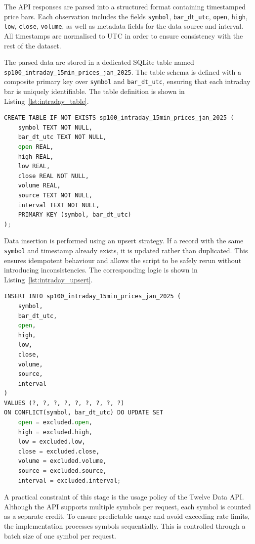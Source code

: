 The API responses are parsed into a structured format containing timestamped price bars. Each observation includes the fields \texttt{symbol}, \texttt{bar\_dt\_utc}, \texttt{open}, \texttt{high}, \texttt{low}, \texttt{close}, \texttt{volume}, as well as metadata fields for the data source and interval. All timestamps are normalised to UTC in order to ensure consistency with the rest of the dataset.

The parsed data are stored in a dedicated SQLite table named \texttt{sp100\_intraday\_15min\_prices\_jan\_2025}. The table schema is defined with a composite primary key over \texttt{symbol} and \texttt{bar\_dt\_utc}, ensuring that each intraday bar is uniquely identifiable. The table definition is shown in Listing~\ref{lst:intraday_table}.

\begin{lstlisting}[language=Python, caption={SQLite table for intraday price data}, label={lst:intraday_table}]
CREATE TABLE IF NOT EXISTS sp100_intraday_15min_prices_jan_2025 (
    symbol TEXT NOT NULL,
    bar_dt_utc TEXT NOT NULL,
    open REAL,
    high REAL,
    low REAL,
    close REAL NOT NULL,
    volume REAL,
    source TEXT NOT NULL,
    interval TEXT NOT NULL,
    PRIMARY KEY (symbol, bar_dt_utc)
);
\end{lstlisting}

Data insertion is performed using an upsert strategy. If a record with the same \texttt{symbol} and timestamp already exists, it is updated rather than duplicated. This ensures idempotent behaviour and allows the script to be safely rerun without introducing inconsistencies. The corresponding logic is shown in Listing~\ref{lst:intraday_upsert}.

\begin{lstlisting}[language=Python, caption={Upserting intraday price bars}, label={lst:intraday_upsert}]
INSERT INTO sp100_intraday_15min_prices_jan_2025 (
    symbol,
    bar_dt_utc,
    open,
    high,
    low,
    close,
    volume,
    source,
    interval
)
VALUES (?, ?, ?, ?, ?, ?, ?, ?, ?)
ON CONFLICT(symbol, bar_dt_utc) DO UPDATE SET
    open = excluded.open,
    high = excluded.high,
    low = excluded.low,
    close = excluded.close,
    volume = excluded.volume,
    source = excluded.source,
    interval = excluded.interval;
\end{lstlisting}

A practical constraint of this stage is the usage policy of the Twelve Data API. Although the API supports multiple symbols per request, each symbol is counted as a separate credit. To ensure predictable usage and avoid exceeding rate limits, the implementation processes symbols sequentially. This is controlled through a batch size of one symbol per request.

